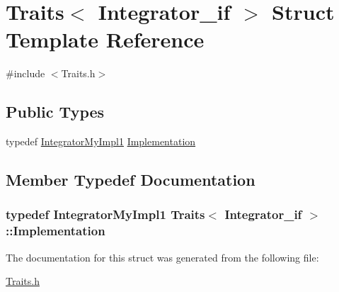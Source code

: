 \hypertarget{struct_traits_3_01_integrator__if_01_4}{\section{Traits$<$ Integrator\-\_\-if $>$ Struct Template Reference}
\label{struct_traits_3_01_integrator__if_01_4}
}


{\ttfamily \#include $<$Traits.\-h$>$}

\subsection*{Public Types}
\begin{DoxyCompactItemize}
\item 
typedef \hyperlink{class_integrator_my_impl1}{Integrator\-My\-Impl1} \hyperlink{struct_traits_3_01_integrator__if_01_4_a5bc6f81f74b024535b7d5ec3a5a414f0}{Implementation}
\end{DoxyCompactItemize}


\subsection{Member Typedef Documentation}
\hypertarget{struct_traits_3_01_integrator__if_01_4_a5bc6f81f74b024535b7d5ec3a5a414f0}{
\subsubsection[{Implementation}]{\setlength{\rightskip}{0pt plus 5cm}typedef {\bf Integrator\-My\-Impl1} {\bf Traits}$<$ {\bf Integrator\-\_\-if} $>$\-::{\bf Implementation}}}\label{struct_traits_3_01_integrator__if_01_4_a5bc6f81f74b024535b7d5ec3a5a414f0}


The documentation for this struct was generated from the following file\-:\begin{DoxyCompactItemize}
\item 
\hyperlink{_traits_8h}{Traits.\-h}\end{DoxyCompactItemize}
